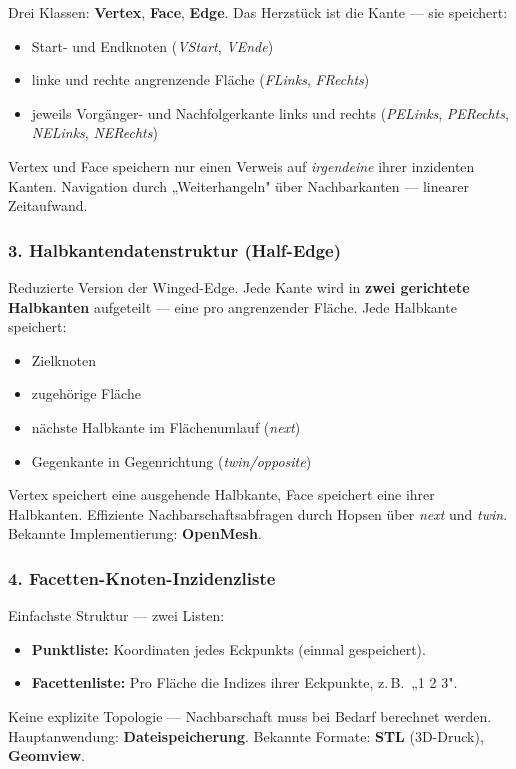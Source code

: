 \documentclass[12pt, a4paper]{article}
\begin{document}
Drei Klassen: \textbf{Vertex}, \textbf{Face}, \textbf{Edge}. Das Herzstück ist die Kante — sie speichert:
\begin{itemize}
  \item Start- und Endknoten (\textit{VStart}, \textit{VEnde})
  \item linke und rechte angrenzende Fläche (\textit{FLinks}, \textit{FRechts})
  \item jeweils Vorgänger- und Nachfolgerkante links und rechts (\textit{PELinks}, \textit{PERechts}, \textit{NELinks}, \textit{NERechts})
\end{itemize}
Vertex und Face speichern nur einen Verweis auf \textit{irgendeine} ihrer inzidenten Kanten. Navigation durch „Weiterhangeln" über Nachbarkanten — linearer Zeitaufwand.

\subsubsection*{3. Halbkantendatenstruktur (Half-Edge)}

Reduzierte Version der Winged-Edge. Jede Kante wird in \textbf{zwei gerichtete Halbkanten} aufgeteilt — eine pro angrenzender Fläche. Jede Halbkante speichert:
\begin{itemize}
  \item Zielknoten
  \item zugehörige Fläche
  \item nächste Halbkante im Flächenumlauf (\textit{next})
  \item Gegenkante in Gegenrichtung (\textit{twin/opposite})
\end{itemize}
Vertex speichert eine ausgehende Halbkante, Face speichert eine ihrer Halbkanten. Effiziente Nachbarschaftsabfragen durch Hopsen über \textit{next} und \textit{twin}. Bekannte Implementierung: \textbf{OpenMesh}.

\subsubsection*{4. Facetten-Knoten-Inzidenzliste}

Einfachste Struktur — zwei Listen:
\begin{itemize}
  \item \textbf{Punktliste:} Koordinaten jedes Eckpunkts (einmal gespeichert).
  \item \textbf{Facettenliste:} Pro Fläche die Indizes ihrer Eckpunkte, z.\,B.\ „1 2 3".
\end{itemize}
Keine explizite Topologie — Nachbarschaft muss bei Bedarf berechnet werden. Hauptanwendung: \textbf{Dateispeicherung}. Bekannte Formate: \textbf{STL} (3D-Druck), \textbf{Geomview}.
\end{document}
